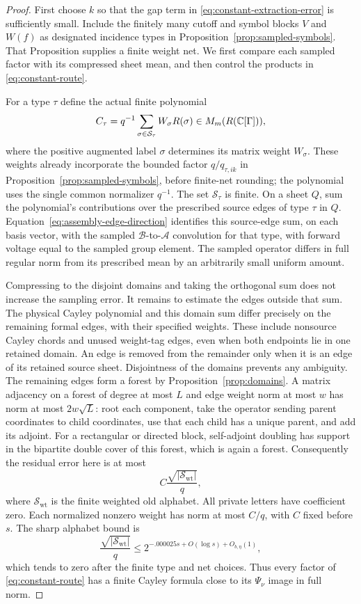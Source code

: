 \begin{proof}
First choose $k$ so that the gap term in
\eqref{eq:constant-extraction-error} is sufficiently small.  Include the
finitely many cutoff and symbol blocks $V$ and $W(f)$ as designated incidence
types in Proposition~\ref{prop:sampled-symbols}.  That Proposition supplies
a finite weight net.  We first compare each sampled factor with its
compressed sheet mean, and then control the products in
\eqref{eq:constant-route}.

For a type $\tau$ define the actual finite polynomial
\begin{equation}\label{eq:finite-cayley-polynomial}
 C_\tau=q^{-1}\sum_{\sigma\in\mathcal S_\tau}
       W_\sigma R(\sigma)\in M_m(R(\mathbb C[\Gamma])),
\end{equation}
where the positive augmented label $\sigma$ determines its matrix weight
$W_\sigma$.  These weights already incorporate the bounded factor
$q/q_{\tau,ik}$ in Proposition~\ref{prop:sampled-symbols}, before finite-net
rounding; the polynomial uses the single common normalizer $q^{-1}$.
The set $\mathcal S_\tau$ is finite.
On a sheet $Q$, sum the polynomial's contributions over the
prescribed source edges of type $\tau$ in $Q$.
Equation~\eqref{eq:assembly-edge-direction} identifies this source-edge
sum, on each basis vector, with the sampled
$\mathscr B$-to-$\mathscr A$ convolution for that type, with forward
voltage equal to the sampled group element.  The sampled operator
differs in full regular norm from its prescribed mean by an arbitrarily
small uniform amount.

Compressing to the disjoint domains and taking the orthogonal sum does not
increase the sampling error.  It remains to estimate the edges outside
that sum.  The physical Cayley polynomial and this domain sum
differ precisely on the remaining formal edges, with their specified
weights.  These include nonsource Cayley chords and unused weight-tag
edges, even when both endpoints lie in one retained domain.  An edge
is removed from the remainder only when it is an edge of its retained
source sheet.  Disjointness of the domains prevents any ambiguity.
The remaining edges form a forest by Proposition~\ref{prop:domains}.
A matrix adjacency on a forest of degree at most $L$ and edge weight norm
at most $w$ has norm at most $2w\sqrt L$: root each component, take the
operator sending parent coordinates to child coordinates, use that each
child has a unique parent, and add its adjoint.  For a rectangular or
directed block, self-adjoint doubling has support in the bipartite double
cover of this forest, which is again a forest.  Consequently the residual
error here is at most
\[
 C\frac{\sqrt{|\mathcal S_{\mathrm{wt}}|}}q,
\]
where $\mathcal S_{\mathrm{wt}}$ is the finite weighted old alphabet.
All private letters have coefficient zero.  Each normalized nonzero weight
has norm at most $C/q$, with $C$ fixed before $s$.  The sharp alphabet bound is
\[
 \frac{\sqrt{|\mathcal S_{\mathrm{wt}}|}}q
 \le 2^{-.000025s+O(\log s)+O_{b,\eta}(1)},
\]
which tends to zero after the finite type and net choices.  Thus every factor
of \eqref{eq:constant-route} has a finite Cayley formula close to its
$\Psi_\nu$ image in full norm.


\end{proof}
